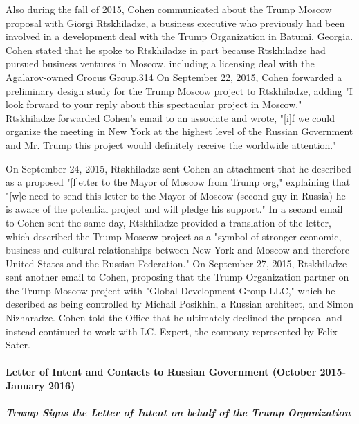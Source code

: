 Also during the fall of 2015, Cohen communicated about the Trump Moscow proposal with Giorgi Rtskhiladze, a business executive who previously had been involved in a development deal with the Trump Organization in Batumi, Georgia.
Cohen stated that he spoke to Rtskhiladze in part because Rtskhiladze had pursued business ventures in Moscow, including a licensing deal with the Agalarov-owned Crocus Group.314 On September 22, 2015, Cohen forwarded a preliminary design study for the Trump Moscow project to Rtskhiladze, adding "I  look forward to your reply about this spectacular project in Moscow."
Rtskhiladze forwarded Cohen's email to an associate and wrote, "[i]f we could organize the meeting in New York at the highest level of the Russian Government and Mr. Trump this project would definitely receive the worldwide attention."

On September 24, 2015, Rtskhiladze sent Cohen an attachment that he described as a proposed "[l]etter to the Mayor of Moscow from Trump org," explaining that "[w]e need to send this letter to the Mayor of Moscow (second guy in Russia) he is aware of the potential project and will pledge his support."
In a second email to Cohen sent the same day, Rtskhiladze provided a translation of the letter, which described the Trump Moscow project as a  "symbol of stronger economic, business and cultural relationships between New York and Moscow and therefore United States and the Russian Federation."
On September 27, 2015, Rtskhiladze sent another email to Cohen, proposing that the Trump Organization partner on the Trump Moscow project with "Global Development Group LLC," which he described as being controlled by Michail Posikhin, a Russian architect, and Simon Nizharadze.
Cohen told the Office that he ultimately declined the proposal and instead continued to work with LC. Expert, the company represented by Felix Sater.

\paragraph{Letter of Intent and Contacts to Russian Government (October 2015-January 2016)}

\subparagraph{Trump Signs the Letter of Intent on behalf of the Trump Organization}

